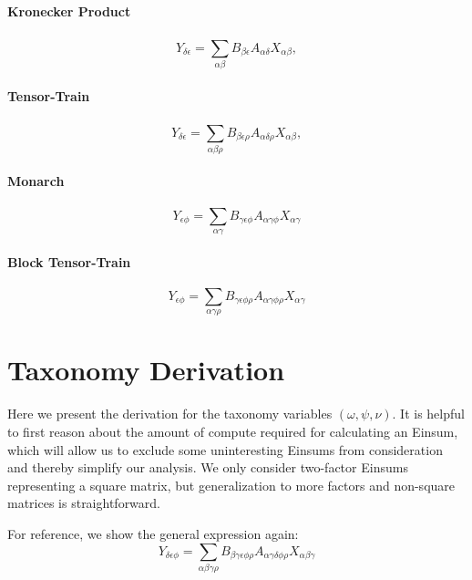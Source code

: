 \documentclass{article}
\begin{document}
\paragraph{Kronecker Product}
\begin{equation}
    Y_{\delta\epsilon}
      =
      \sum_{\alpha\beta}^{}
      B_{\beta\epsilon} A_{\alpha\delta} X_{\alpha\beta},
\end{equation}

\paragraph{Tensor-Train}
\begin{equation}
    Y_{\delta\epsilon}
      =
      \sum_{\alpha\beta\rho}^{}
      B_{\beta\epsilon\rho} A_{\alpha\delta\rho} X_{\alpha\beta},
\end{equation}
\paragraph{Monarch}
\begin{equation}
      Y_{\epsilon \phi}
      =
      \sum_{\alpha \gamma}
         B_{\gamma \epsilon \phi} A_{\alpha \gamma \phi} X_{\alpha \gamma}
\end{equation}
\paragraph{Block Tensor-Train}
\begin{equation}
      Y_{\epsilon \phi}
      =
      \sum_{\alpha \gamma \rho}
         B_{\gamma \epsilon \phi \rho} A_{\alpha \gamma \phi \rho} X_{\alpha \gamma}
\end{equation}

\section{Taxonomy Derivation} \label{app:inequalities}
Here we present the derivation for the taxonomy variables $(\omega,\psi,\nu).$ It is helpful to first reason about the amount of compute required for calculating an Einsum, which will allow us to exclude some uninteresting Einsums from consideration and thereby simplify our analysis. We only consider two-factor Einsums representing a square matrix, but generalization to more factors and non-square matrices is straightforward.

For reference, we show the general expression again:
\begin{equation} \label{eq:2core}
      Y_{\delta \epsilon \phi}
      =
      \sum_{\alpha \beta \gamma \rho}
         B_{\beta \gamma \epsilon \phi \rho} A_{\alpha \gamma \delta \phi \rho} X_{\alpha \beta \gamma}
 \end{equation}
\end{document}
